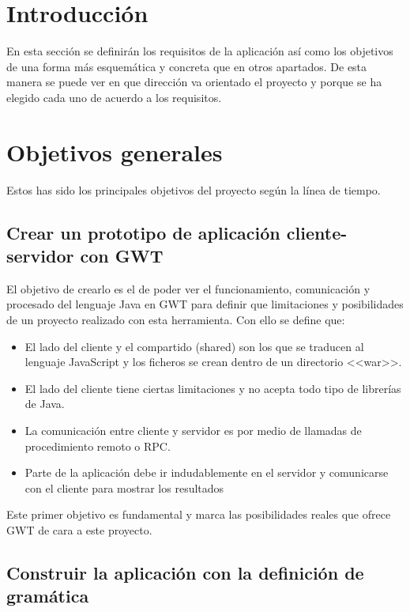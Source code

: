 
\section{Introducción}

En esta sección se definirán los requisitos de la aplicación así como los objetivos de una forma más esquemática y concreta que en otros apartados. De esta manera se puede ver en que dirección va orientado el proyecto y porque se ha elegido cada uno de acuerdo a los requisitos.

\section{Objetivos generales}

Estos has sido los principales objetivos del proyecto según la línea de tiempo.

\subsection{Crear un prototipo de aplicación cliente-servidor con GWT}

El objetivo de crearlo es el de poder ver el funcionamiento, comunicación y procesado del lenguaje Java en GWT para definir que limitaciones y posibilidades de un proyecto realizado con esta herramienta. Con ello se define que:  
\begin{itemize}
\item El lado del cliente y el compartido (shared) son los que se traducen al lenguaje JavaScript y los ficheros se crean dentro de un directorio <<war>>.
\item El lado del cliente tiene ciertas limitaciones y no acepta todo tipo de librerías de Java. 
\item La comunicación entre cliente y servidor es por medio de llamadas de procedimiento remoto o RPC.
\item Parte de la aplicación debe ir indudablemente en el servidor y comunicarse con el cliente para mostrar los resultados 
\end{itemize}

Este primer objetivo es fundamental y marca las posibilidades reales que ofrece GWT de cara a este proyecto.

\subsection{Construir la aplicación con la definición de gramática}

